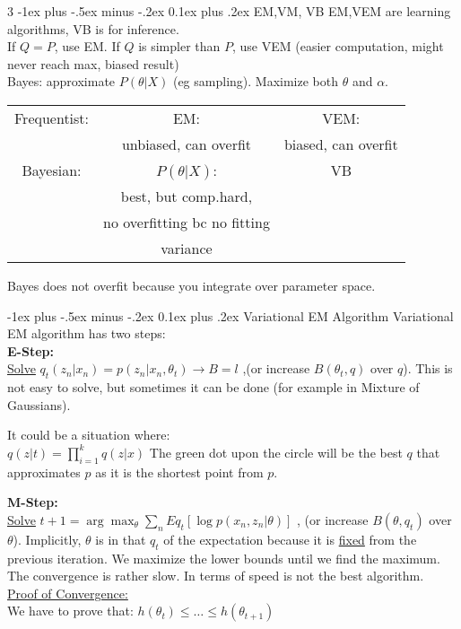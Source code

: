 \documentclass[a4paper,landscape]{amsmlaj}
\makeatletter
\renewcommand{\subsection}{\@startsection{subsection}{2}{0mm}
	{-1ex plus -.5ex minus -.2ex}
	{0.1ex plus .2ex}
	{\normalfont\normalsize\bfseries}}
\makeatother
\begin{document}
\begin{multicols*}{3}
\subsection{EM,VM, VB}
EM,VEM are learning algorithms, VB is for inference.\\
If $Q=P$, use EM. If $Q$ is simpler than $P$, use VEM (easier computation, might
never reach max, biased result)\\
Bayes: approximate $P(\theta|X)$ (eg sampling). Maximize both $\theta$ and $\alpha$.\\
\begin{tabular}{|c|c|c|}
\hline
Frequentist: & EM:  & VEM: \\
 & unbiased, can overfit & biased, can overfit\\
\hline
Bayesian: & $P(\theta|X)$: & VB\\
& best, but comp.hard,  & \\
& no overfitting bc no fitting & \\
& variance & \\
\hline
\end{tabular}
Bayes does not overfit because you integrate over parameter space.

\subsection{Variational EM Algorithm}
Variational EM algorithm has two steps:\\
 \textbf{E-Step:}\\
  \underline{Solve}
  $q_{t}(z_{n}|x_{n}) = p(z_{n}|x_{n},\theta_{t})\rightarrow B = l$
,(or increase $B(\theta_t, q)$ over $q$). This is not easy to solve, but
sometimes it can be done (for example in Mixture of Gaussians).

It could be a situation where:\\
$q(z|t) = \prod_{i=1}^k q(z|x)$
The green dot upon the circle will be the best $q$ that approximates $p$ as it
is the shortest point from $p$.

\textbf{M-Step:}\\
\underline{Solve}
${t+1} = \arg\max_{\theta} \sum_{n} Eq_{t}[\log p(x_{n},z_{n}|\theta)]$
, (or increase $B(\theta,q_{t})$ over $\theta$). Implicitly, $\theta$ is in that
$q_{t}$ of the expectation because it is \underline{fixed} from the previous
iteration. We maximize the lower bounds until we find the maximum. The
convergence is rather slow. In terms of speed is not the best algorithm.\\
\underline{Proof of Convergence:}\\
We have to prove that:
$h(\theta_{t}) \leq \ldots \leq h(\theta_{t+1})$


\end{multicols*}
\end{document}

